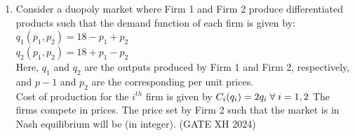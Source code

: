 \documentclass{article}
\begin{document}
\begin{enumerate}
    \item Consider a duopoly market where Firm 1 and Firm 2 produce differentiated products such that the demand function of each firm is given by: \\
    $q_1(p_1,p_2)=18-p_1+p_2$ \\
    $q_2(p_1,p_2)=18+p_1-p_2$ \\
    Here, $q_1$ and $q_2$ are the outputs produced by Firm 1 and Firm 2, respectively, and $p-1$ and $p_2$ are the corresponding per unit prices. \\
    Cost of production for the $i^{th}$ firm is given by $C_i(q_i)=2q_i\hspace{0.1cm}\forall\hspace{0.1cm} i=1,2$ The firms compete in prices. The price set by Firm 2 such that the market is in Nash equilibrium will be \makebox[1cm]{\hrulefill} (in integer).  \hfill (GATE XH 2024)

    


    

\end{enumerate}
\end{document}
